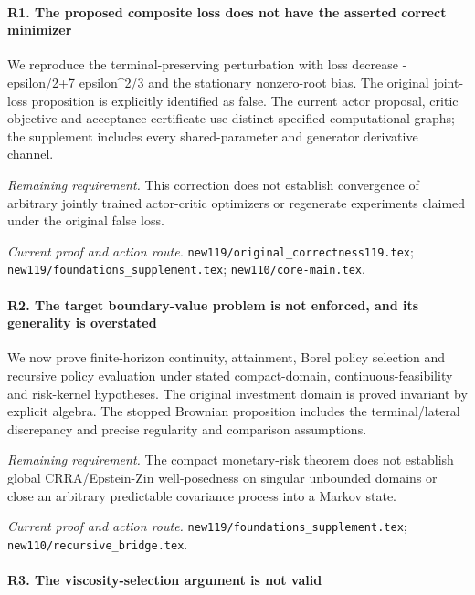 \paragraph{R1. The proposed composite loss does not have the asserted correct minimizer}

We reproduce the terminal-preserving perturbation with loss decrease -epsilon/2+7 epsilon\textasciicircum{}2/3 and the stationary nonzero-root bias. The original joint-loss proposition is explicitly identified as false. The current actor proposal, critic objective and acceptance certificate use distinct specified computational graphs; the supplement includes every shared-parameter and generator derivative channel.

\par\emph{Remaining requirement.} This correction does not establish convergence of arbitrary jointly trained actor-critic optimizers or regenerate experiments claimed under the original false loss.

\par\emph{Current proof and action route.} \nolinkurl{new119/original_correctness119.tex}; \nolinkurl{new119/foundations_supplement.tex}; \nolinkurl{new110/core-main.tex}.

\paragraph{R2. The target boundary-value problem is not enforced, and its generality is overstated}

We now prove finite-horizon continuity, attainment, Borel policy selection and recursive policy evaluation under stated compact-domain, continuous-feasibility and risk-kernel hypotheses. The original investment domain is proved invariant by explicit algebra. The stopped Brownian proposition includes the terminal/\allowbreak{}lateral discrepancy and precise regularity and comparison assumptions.

\par\emph{Remaining requirement.} The compact monetary-risk theorem does not establish global CRRA/\allowbreak{}Epstein-Zin well-posedness on singular unbounded domains or close an arbitrary predictable covariance process into a Markov state.

\par\emph{Current proof and action route.} \nolinkurl{new119/foundations_supplement.tex}; \nolinkurl{new110/recursive_bridge.tex}.

\paragraph{R3. The viscosity-selection argument is not valid}

